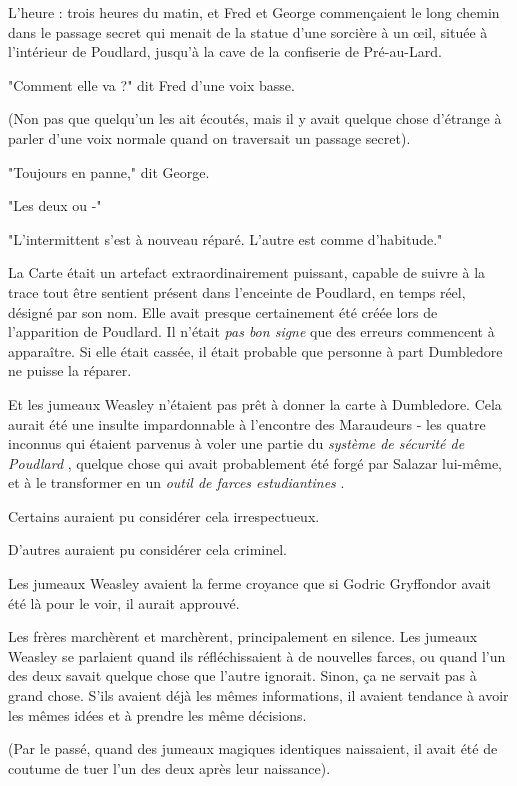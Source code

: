 L'heure : trois heures du matin, et Fred et George commençaient le long chemin dans le passage secret qui menait de la statue d'une sorcière à un œil, située à l'intérieur de Poudlard, jusqu'à la cave de la confiserie de Pré-au-Lard.

"Comment elle va ?" dit Fred d'une voix basse.

(Non pas que quelqu'un les ait écoutés, mais il y avait quelque chose d'étrange à parler d'une voix normale quand on traversait un passage secret).

"Toujours en panne," dit George.

"Les deux ou -"

"L'intermittent s'est à nouveau réparé. L'autre est comme d'habitude."

La Carte était un artefact extraordinairement puissant, capable de suivre à la trace tout être sentient présent dans l'enceinte de Poudlard, en temps réel, désigné par son nom. Elle avait presque certainement été créée lors de l'apparition de Poudlard. Il n'était \emph{pas bon signe} que des erreurs commencent à apparaître. Si elle était cassée, il était probable que personne à part Dumbledore ne puisse la réparer.

Et les jumeaux Weasley n'étaient pas prêt à donner la carte à Dumbledore. Cela aurait été une insulte impardonnable à l'encontre des Maraudeurs - les quatre inconnus qui étaient parvenus à voler une partie du \emph{système de sécurité de Poudlard} , quelque chose qui avait probablement été forgé par Salazar lui-même, et à le transformer en un \emph{outil de farces estudiantines} .

Certains auraient pu considérer cela irrespectueux.

D'autres auraient pu considérer cela criminel.

Les jumeaux Weasley avaient la ferme croyance que si Godric Gryffondor avait été là pour le voir, il aurait approuvé.

Les frères marchèrent et marchèrent, principalement en silence. Les jumeaux Weasley se parlaient quand ils réfléchissaient à de nouvelles farces, ou quand l'un des deux savait quelque chose que l'autre ignorait. Sinon, ça ne servait pas à grand chose. S'ils avaient déjà les mêmes informations, il avaient tendance à avoir les mêmes idées et à prendre les même décisions.

(Par le passé, quand des jumeaux magiques identiques naissaient, il avait été de coutume de tuer l'un des deux après leur naissance).

